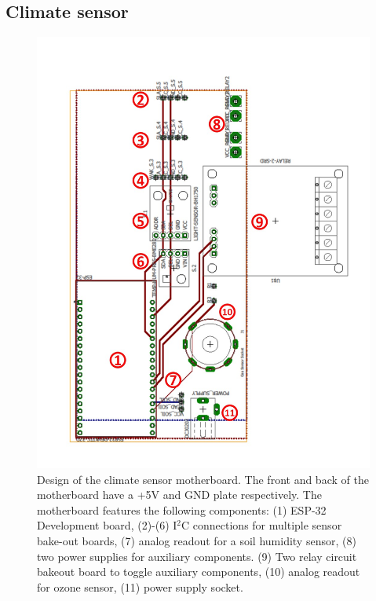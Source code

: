 \documentclass[reprint,superscriptaddress,aps,amsmath,amssymb]{revtex4-1}
\begin{document}
\subsection{Climate sensor}
\begin{figure}
    \centering
    \includegraphics[width = 1\linewidth]{tomatoESPSchematic.jpg}
    \caption{Design of the climate sensor motherboard. The front and back of the motherboard have a +5V and GND plate respectively. The motherboard features the following components: (1) ESP-32 Development board, (2)-(6) I$^2$C connections for multiple sensor bake-out boards, (7) analog readout for a soil humidity sensor, (8) two power supplies for  auxiliary components. (9) Two relay circuit bakeout board to toggle auxiliary components, (10) analog readout for ozone sensor, (11) power supply socket.}
    \label{fig:ESP_motherboard}
\end{figure}
\end{document}
